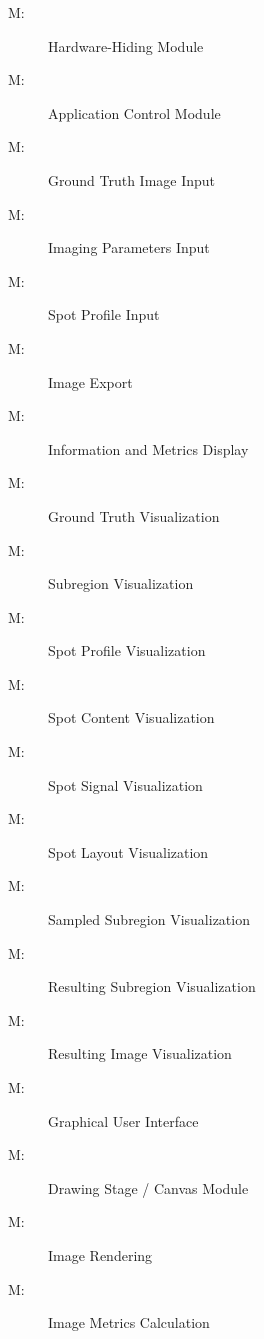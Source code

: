 \documentclass[12pt, titlepage]{article}
\newcounter{mnum}
\newcommand{\mthemnum}{M\themnum}
\begin{document}
\begin{description}
\item [ \mthemnum \label{M_HdwHide}:] Hardware-Hiding Module
\item [ \mthemnum \label{M_control}:] Application Control Module
\item [ \mthemnum \label{M_imgGTInput}:] Ground Truth Image Input
\item [ \mthemnum \label{M_params}:] Imaging Parameters Input
\item [ \mthemnum \label{M_inSpotProfile}:] Spot Profile Input
\item [ \mthemnum \label{M_export}:] Image Export
\item [ \mthemnum \label{M_infoDisp}:] Information and Metrics Display
\item [ \mthemnum \label{M_vizGT}:] Ground Truth Visualization
\item [ \mthemnum \label{M_vizSubregion}:] Subregion Visualization
\item [ \mthemnum \label{M_vizSpotProfile}:] Spot Profile Visualization
\item [ \mthemnum \label{M_vizSpotContent}:] Spot Content Visualization
\item [ \mthemnum \label{M_vizSpotSignal}:] Spot Signal Visualization
\item [ \mthemnum \label{M_vizSpotLayout}:] Spot Layout Visualization
\item [ \mthemnum \label{M_vizSampledSub}:] Sampled Subregion Visualization
\item [ \mthemnum \label{M_vizResultSub}:] Resulting Subregion Visualization
\item [ \mthemnum \label{M_vizResultImg}:] Resulting Image Visualization
\item [ \mthemnum \label{M_GUI}:] Graphical User Interface
\item [ \mthemnum \label{M_drawStage}:] Drawing Stage / Canvas Module
\item [ \mthemnum \label{M_rendering}:] Image Rendering
\item [ \mthemnum \label{M_metric}:] Image Metrics Calculation
\end{description}
\end{document}
